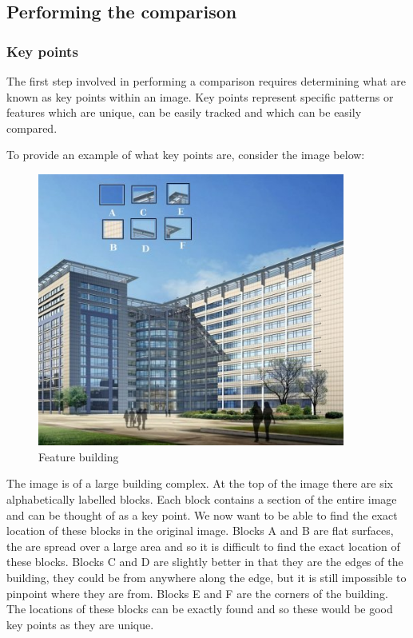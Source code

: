 \documentclass[11pt,a4paper]{report}
\begin{document}
			\subsection{Performing the comparison}
				\subsubsection{Key points}
					The first step involved in performing a comparison requires determining what are known as key points within an image. Key points represent specific patterns or features which are unique, can be easily tracked and which can be easily compared.
					
					To provide an example of what key points are, consider the image below:
					
					\begin{figure}[h!]
						\centering
						\includegraphics[width=0.9\textwidth]{feature_building}
						\caption{Feature building}
					\end{figure}
					
					The image is of a large building complex. At the top of the image there are six alphabetically labelled blocks. Each block contains a section of the entire image and can be thought of as a key point. We now want to be able to find the exact location of these blocks in the original image. 
					Blocks A and B are flat surfaces, the are spread over a large area and so it is difficult to find the exact location of these blocks.
					Blocks C and D are slightly better in that they are the edges of the building, they could be from anywhere along the edge, but it is still impossible to pinpoint where they are from.
					Blocks E and F are the corners of the building. The locations of these blocks can be exactly found and so these would be good key points as they are unique.
				
\end{document}
